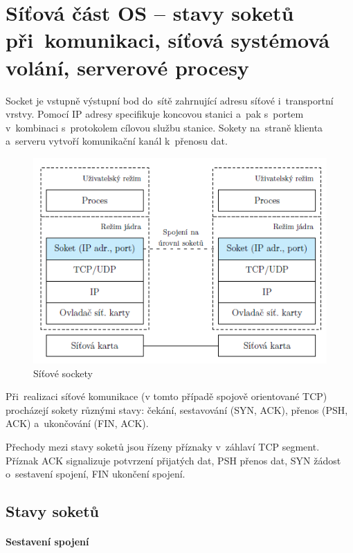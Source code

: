 
\clearpage
\section{Síťová část OS -- stavy soketů při~komunikaci, síťová systémová volání, serverové procesy}

Socket je vstupně výstupní bod do~sítě zahrnující adresu síťové i~transportní vrstvy. Pomocí IP adresy specifikuje koncovou stanici a~pak s~portem v~kombinaci s~protokolem cílovou službu stanice. Sokety na~straně klienta a~serveru vytvoří komunikační kanál k~přenosu dat.

\begin{figure}[ht]
	\centering
	\includegraphics[scale=1]{images/network_socket.png}
	\caption{Síťové sockety}
	\label{network_socket}
\end{figure}

Při~realizaci síťové komunikace (v tomto případě spojově orientované TCP) procházejí sokety různými stavy: čekání, sestavování (SYN, ACK), přenos (PSH, ACK) a~ukončování (FIN, ACK).

Přechody mezi stavy soketů jsou řízeny příznaky v~záhlaví TCP segment. Příznak ACK signalizuje potvrzení přijatých dat, PSH přenos dat, SYN žádost o~sestavení spojení, FIN ukončení spojení.

\subsection{Stavy soketů}

\paragraph{Sestavení spojení}

